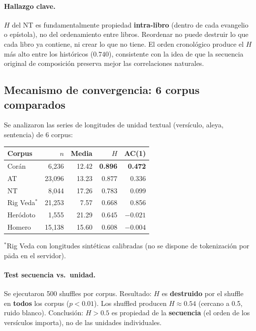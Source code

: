 \documentclass[12pt,a4paper]{article}
\newcommand{\val}[1]{\textcolor{hlcolor}{\textbf{#1}}}
\begin{document}
\paragraph{Hallazgo clave.}
$H$ del NT es fundamentalmente propiedad \textbf{intra-libro} (dentro de cada
evangelio o ep\'istola), no del ordenamiento entre libros.
Reordenar no puede destruir lo que cada libro ya contiene,
ni crear lo que no tiene.
El orden cronol\'ogico produce el $H$ m\'as alto entre los hist\'oricos ($0.740$),
consistente con la idea de que la secuencia original de composici\'on
preserva mejor las correlaciones naturales.

\subsection{Mecanismo de convergencia: 6 corpus comparados}

Se analizaron las series de longitudes de unidad textual (vers\'iculo, aleya,
sentencia) de 6 corpus:

\begin{center}\small
\begin{tabular}{lrrrr}
\toprule
Corpus & $n$ & Media & $H$ & AC(1) \\
\midrule
Cor\'an        & 6,236  & 12.42 & \val{0.896} & \val{0.472} \\
AT             & 23,096 & 13.23 & 0.877 & 0.336 \\
NT             & 8,044  & 17.26 & 0.783 & 0.099 \\
Rig Veda$^*$   & 21,253 &  7.57 & 0.668 & 0.856 \\
Her\'odoto     & 1,555  & 21.29 & 0.645 & $-0.021$ \\
Homero         & 15,138 & 15.60 & 0.608 & $-0.004$ \\
\bottomrule
\end{tabular}
\end{center}
{\footnotesize $^*$Rig Veda con longitudes sint\'eticas calibradas (no se dispone de
tokenizaci\'on por p\=ada en el servidor).}

\paragraph{Test secuencia vs.\ unidad.}
Se ejecutaron 500 shuffles por corpus. Resultado: $H$ es \textbf{destruido}
por el shuffle en \textbf{todos} los corpus ($p < 0.01$). Los shuffled producen
$H \approx 0.54$ (cercano a 0.5, ruido blanco).
Conclusi\'on: $H > 0.5$ es propiedad de la \textbf{secuencia} (el orden de los
vers\'iculos importa), no de las unidades individuales.
\end{document}
